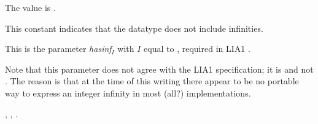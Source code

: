 \documentclass[../Integers.tex]{subfiles}
\begin{document}

\DValues{}

The value is .

\DDescription{}

This constant indicates that the \CL{} datatype  does not
include infinities.

\DNotes{}

This is the parameter \textit{hasinf}$_I$ with $I$ equal to
, required in LIA1 \cite{2012:LIA1}.

Note that this parameter does not agree with the LIA1
specification; it is  and not .  The reason is that at the time
of this writing there appear to be no portable way to express an
integer infinity in most (all?) \CL{} implementations.


\DSeeAlso{}

, , .
\end{document}
